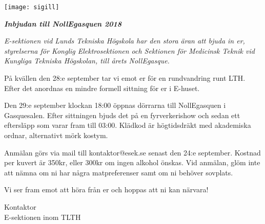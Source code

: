\documentclass[11pt]{article}
\makeatletter
\def\date{2018}
\def\doctitle{Inbjudan till NollEgasquen \date}
\newcommand{\inviteto}[1]{

    \begin{center}
        \texttt{[image: sigill]}
        \par
        \vspace*{7mm}

        \textit{\textbf{\huge \doctitle}}
    \end{center}

    {\it
    E-sektionen vid Lunds Tekniska Högskola har den stora äran att bjuda in er, {#1}, till årets NollEgasque.

    På kvällen den 28:e september tar vi emot er för en rundvandring runt LTH. Efter det anordnas en mindre formell sittning för er i E-huset.

    Den 29:e september klockan 18:00 öppnas dörrarna till NollEgasquen i Gasquesalen. Efter sittningen bjuds det på en fyrverkerishow och sedan ett eftersläpp som varar fram till 03:00. Klädkod är högtidsdräkt med akademiska ordnar, alternativt mörk kostym.

    Anmälan görs via mail till kontaktor@esek.se senast den 24:e september. Kostnad per kuvert är 350kr, eller 300kr om ingen alkohol önskas. Vid anmälan, glöm inte att nämna om ni har några matpreferenser samt om ni behöver sovplats.

    Vi ser fram emot att höra från er och hoppas att ni kan närvara!
    }

    \begin{signatures}{1}
    \signature{Axel Voss}{Kontaktor\\E-sektionen inom TLTH}
  \end{signatures}}
\makeatother
\begin{document}
  \inviteto{styrelserna för Konglig Elektrosektionen och Sektionen för Medicinsk Teknik vid Kungliga Tekniska Högskolan}
\end{document}
